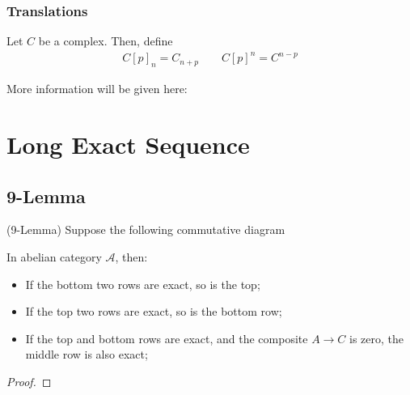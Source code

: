 \documentclass[Total.tex]{subfiles}
\begin{document}
			
			\subsubsection{Translations}
			\begin{Def}
				Let $C$ be a complex. Then, define
				\begin{gather*}
					C[p]_n=C_{n+p}\qquad C[p]^n=C^{n-p}
				\end{gather*}
			\end{Def}
			More information will be given here:
		\section{Long Exact Sequence}
			\subsection{9-Lemma}
			\begin{proposition}
				(9-Lemma) Suppose the following commutative diagram
				\begin{center}
				\end{center}
				In abelian category $\mathcal{A}$, then:
				\begin{itemize}
					\item If the bottom two rows are exact, so is the top;
					\item If the top two rows are exact, so is the bottom row;
					\item If the top and bottom rows are exact, and the composite $A\rightarrow C$ is zero, the middle row is also exact;
				\end{itemize}
			\end{proposition}
			\begin{proof}
				
			\end{proof}
\end{document}
